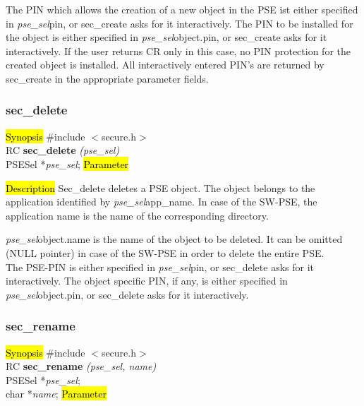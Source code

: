 The PIN which allows the creation of a new object in the PSE ist either specified in
{\em pse\_sel}\pf pin, or sec\_create asks for it interactively.
The PIN to be installed for the object
is either specified in {\em pse\_sel}\pf object.pin, or sec\_create asks for it interactively.
If the user returns CR only in this case, no PIN protection for the created object
is installed. All interactively entered PIN's are returned by sec\_create in the appropriate
parameter fields.

\subsubsection{sec\_delete}
\label{sec_delete}
\hl{Synopsis}
\#include $<$secure.h$>$ \\ [0.5cm]
RC {\bf sec\_delete} {\em (pse\_sel)} \\
PSESel *{\em pse\_sel};
\hl{Parameter}

\hl{Description}
Sec\_delete deletes a PSE object. 
The object belongs to the application identified by {\em pse\_sel}\pf app\_name.
In case of the SW-PSE, the application name is the name of the corresponding directory. 

{\em pse\_sel}\pf object.name is the name of the object to be deleted. It can be omitted 
(NULL pointer) in case of the SW-PSE in order to delete the entire PSE. \\[1ex]
The PSE-PIN is either specified in
{\em pse\_sel}\pf pin, or sec\_delete asks for it interactively.
The object specific PIN, if any, is either specified in {\em pse\_sel}\pf object.pin, 
or sec\_delete asks for it interactively.

\subsubsection{sec\_rename}
\label{sec_rename}
\hl{Synopsis}
\#include $<$secure.h$>$ \\ [0.5cm]
RC {\bf sec\_rename} {\em (pse\_sel, name)} \\
PSESel *{\em pse\_sel}; \\
char  *{\em name};
\hl{Parameter}


